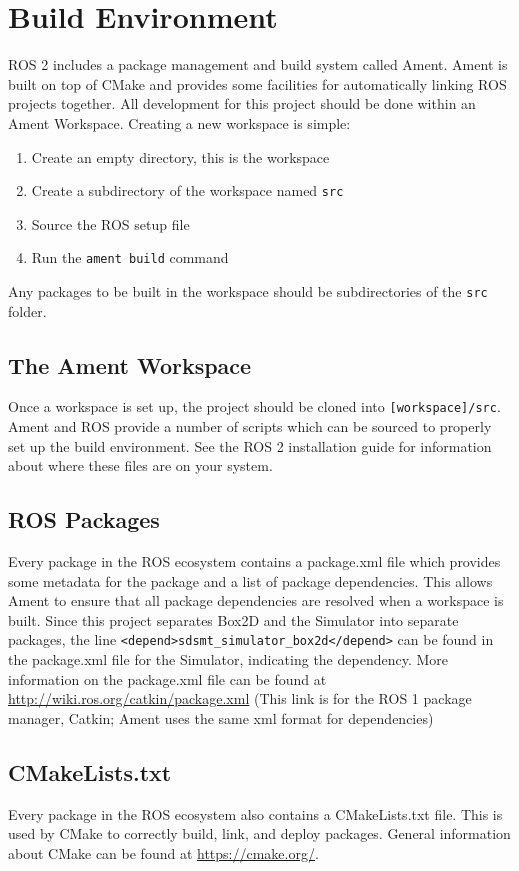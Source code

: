\section{Build  Environment} \label{sec:buildenv}
ROS 2 includes a package management and build system called Ament. Ament is built on top of CMake and provides some facilities for automatically linking ROS projects together.
All development for this project should be done within an Ament Workspace. Creating a new workspace is simple:
\begin{enumerate}
	\item Create an empty directory, this is the workspace
	\item Create a subdirectory of the workspace named \lstinline|src|
	\item Source the ROS setup file
	\item Run the \lstinline|ament build| command
\end{enumerate}
Any packages to be built in the workspace should be subdirectories of the \lstinline|src| folder.

\subsection{The Ament Workspace}
Once a workspace is set up, the project should be cloned into \lstinline|[workspace]/src|.
Ament and ROS provide a number of scripts which can be sourced to properly set up the build environment. See the ROS 2 installation guide for information about where these files are on your system.

\subsection{ROS Packages}
Every package in the ROS ecosystem contains a package.xml file which provides some metadata for the package and a list of package dependencies. This allows Ament to ensure that all package dependencies are resolved when a workspace is built. Since this project separates Box2D and the Simulator into separate packages, the line \lstinline|<depend>sdsmt_simulator_box2d</depend>| can be found in the package.xml file for the Simulator, indicating the dependency.  More information on the package.xml file can be found at \url{http://wiki.ros.org/catkin/package.xml} (This link is for the ROS 1 package manager, Catkin; Ament uses the same xml format for dependencies)

\subsection{CMakeLists.txt}
Every package in the ROS ecosystem also contains a CMakeLists.txt file. This is used by CMake to correctly build, link, and deploy packages. General information about CMake can be found at \url{https://cmake.org/}.

